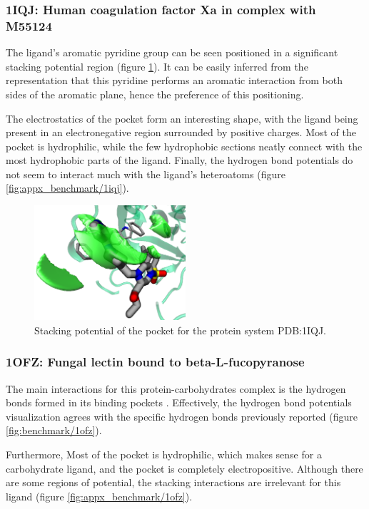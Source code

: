     \subsubsection{1IQJ: Human coagulation factor Xa in complex with M55124}
      The ligand's aromatic pyridine group can be seen positioned in a significant stacking potential region (figure \ref{fig:benchmark/1iqj}). It can be easily inferred from the representation that this pyridine performs an aromatic interaction from both sides of the aromatic plane, hence the preference of this positioning.

      The electrostatics of the pocket form an interesting shape, with the ligand being present in an electronegative region surrounded by positive charges. Most of the pocket is hydrophilic, while the few hydrophobic sections neatly connect with the most hydrophobic parts of the ligand. Finally, the hydrogen bond potentials do not seem to interact much with the ligand's heteroatoms (figure \ref{fig:appx_benchmark/1iqj}).

      \begin{figure}[H]
        \centering
        \includegraphics[width=0.5\textwidth]{figures/results/benchmark_prot/1iqj.png}
        \caption{\label{fig:benchmark/1iqj} Stacking potential of the pocket for the protein system PDB:1IQJ.}
      \end{figure}
    \pagebreak

    \subsubsection{1OFZ: Fungal lectin bound to beta-L-fucopyranose}
      The main interactions for this protein-carbohydrates complex is the hydrogen bonds formed in its binding pockets \cite{hbonds_2023}. Effectively, the hydrogen bond potentials visualization agrees with the specific hydrogen bonds previously reported (figure \ref{fig:benchmark/1ofz}).

      Furthermore, Most of the pocket is hydrophilic, which makes sense for a carbohydrate ligand, and the pocket is completely electropositive. Although there are some regions of potential, the stacking interactions are irrelevant for this ligand (figure \ref{fig:appx_benchmark/1ofz}).

